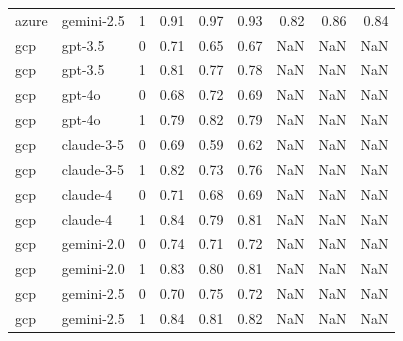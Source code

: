 \begin{tabular}{llrrrrrrr}
azure & gemini-2.5 & 1 & 0.91 & 0.97 & 0.93 & 0.82 & 0.86 & 0.84 \\
gcp & gpt-3.5 & 0 & 0.71 & 0.65 & 0.67 & NaN & NaN & NaN \\
gcp & gpt-3.5 & 1 & 0.81 & 0.77 & 0.78 & NaN & NaN & NaN \\
gcp & gpt-4o & 0 & 0.68 & 0.72 & 0.69 & NaN & NaN & NaN \\
gcp & gpt-4o & 1 & 0.79 & 0.82 & 0.79 & NaN & NaN & NaN \\
gcp & claude-3-5 & 0 & 0.69 & 0.59 & 0.62 & NaN & NaN & NaN \\
gcp & claude-3-5 & 1 & 0.82 & 0.73 & 0.76 & NaN & NaN & NaN \\
gcp & claude-4 & 0 & 0.71 & 0.68 & 0.69 & NaN & NaN & NaN \\
gcp & claude-4 & 1 & 0.84 & 0.79 & 0.81 & NaN & NaN & NaN \\
gcp & gemini-2.0 & 0 & 0.74 & 0.71 & 0.72 & NaN & NaN & NaN \\
gcp & gemini-2.0 & 1 & 0.83 & 0.80 & 0.81 & NaN & NaN & NaN \\
gcp & gemini-2.5 & 0 & 0.70 & 0.75 & 0.72 & NaN & NaN & NaN \\
gcp & gemini-2.5 & 1 & 0.84 & 0.81 & 0.82 & NaN & NaN & NaN \\
\bottomrule
\end{tabular}
